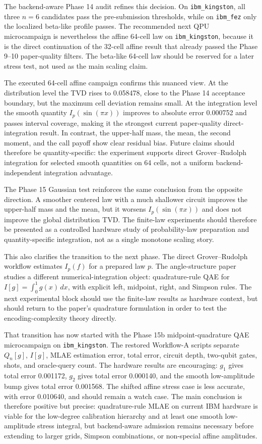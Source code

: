 The backend-aware Phase 14 audit refines this decision. On
\texttt{ibm\_kingston}, all three \(n=6\) candidates pass the pre-submission
thresholds, while on \texttt{ibm\_fez} only the localized beta-like profile
passes. The recommended next QPU microcampaign is nevertheless the affine
64-cell law on \texttt{ibm\_kingston}, because it is the direct continuation of
the 32-cell affine result that already passed the Phase 9--10 paper-quality
filters. The beta-like 64-cell law should be reserved for a later stress test,
not used as the main scaling claim.

The executed 64-cell affine campaign confirms this nuanced view. At the
distribution level the TVD rises to 0.058478, close to the Phase 14 acceptance
boundary, but the maximum cell deviation remains small. At the integration
level the smooth quantity \(I_p(\sin(\pi x))\) improves to absolute error
0.000752 and passes interval coverage, making it the strongest current
paper-quality direct-integration result. In contrast, the upper-half mass, the
mean, the second moment, and the call payoff show clear residual bias. Future
claims should therefore be quantity-specific: the experiment supports direct
Grover--Rudolph integration for selected smooth quantities on 64 cells, not a
uniform backend-independent integration advantage.

The Phase 15 Gaussian test reinforces the same conclusion from the opposite
direction. A smoother centered law with a much shallower circuit improves the
upper-half mass and the mean, but it worsens \(I_p(\sin(\pi x))\) and does not
improve the global distribution TVD. The finite-law experiments should
therefore be presented as a controlled hardware study of probability-law
preparation and quantity-specific integration, not as a single monotone scaling
story.

This also clarifies the transition to the next phase. The direct
Grover--Rudolph workflow estimates \(I_p(f)\) for a prepared law \(p\). The
angle-structure paper studies a different numerical-integration object:
quadrature-rule QAE for \(I[g]=\int_0^1 g(x)\,dx\), with explicit left,
midpoint, right, and Simpson rules. The next experimental block should use the
finite-law results as hardware context, but should return to the paper's
quadrature formulation in order to test the encoding-complexity theory
directly.

That transition has now started with the Phase 15b midpoint-quadrature QAE
microcampaign on \texttt{ibm\_kingston}. The restored Workflow-A scripts
separate \(Q_n[g]\), \(I[g]\), MLAE estimation error, total error, circuit
depth, two-qubit gates, shots, and oracle-query count. The hardware results are
encouraging: \(g_1\) gives total error 0.001172, \(g_2\) gives total error
0.000140, and the smooth low-amplitude bump gives total error 0.001568. The
shifted affine stress case is less accurate, with error 0.010640, and should
remain a watch case. The main conclusion is therefore positive but precise:
quadrature-rule MLAE on current IBM hardware is viable for the low-degree
calibration hierarchy and at least one smooth low-amplitude stress integral,
but backend-aware admission remains necessary before extending to larger
grids, Simpson combinations, or non-special affine amplitudes.

